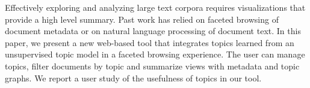 Effectively exploring and analyzing large text corpora requires   visualizations that provide a high level summary. Past
   work has relied on faceted browsing of
   document metadata or on natural language processing of document
   text. In this paper, we present a new web-based tool that 
   integrates topics learned from an unsupervised 
   topic model in a faceted browsing experience. The user can manage topics,
 filter documents by topic and summarize views with 
   metadata and topic graphs. We report a user study 
   of the usefulness of topics in our tool.

